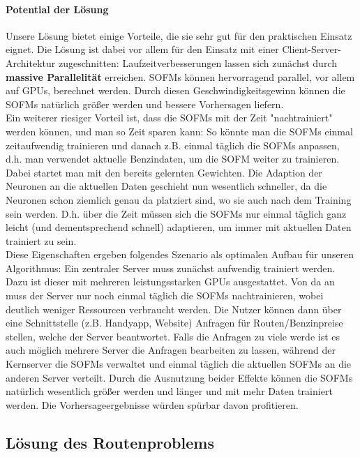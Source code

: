 \documentclass[11pt]{article}
\begin{document}
	
	\paragraph{Potential der Lösung\\}
	\label{potential}
	Unsere Lösung bietet einige Vorteile, die sie sehr gut für den praktischen Einsatz eignet. Die Lösung ist dabei vor allem für den Einsatz mit einer Client-Server-Architektur zugeschnitten:
	Laufzeitverbesserungen lassen sich zunächst durch \textbf{massive Parallelität} erreichen. SOFMs können hervorragend parallel, vor allem auf GPUs, berechnet werden. Durch diesen Geschwindigkeitsgewinn können die SOFMs natürlich größer werden und bessere Vorhersagen liefern.\\
	Ein weiterer riesiger Vorteil ist, dass die SOFMs mit der Zeit "nachtrainiert" werden können, und man so Zeit sparen kann: So könnte man die SOFMs einmal zeitaufwendig trainieren und danach z.B. einmal täglich die SOFMs anpassen, d.h. man verwendet aktuelle Benzindaten, um die SOFM weiter zu trainieren. Dabei startet man mit den bereits gelernten Gewichten. Die Adaption der Neuronen an die aktuellen Daten geschieht nun wesentlich schneller, da die Neuronen schon ziemlich genau da platziert sind, wo sie auch nach dem Training sein werden. D.h. über die Zeit müssen sich die SOFMs nur einmal täglich ganz leicht (und dementsprechend schnell) adaptieren, um immer mit aktuellen Daten trainiert zu sein.\\
	Diese Eigenschaften ergeben folgendes Szenario als optimalen Aufbau für unseren Algorithmus: Ein zentraler Server muss zunächst aufwendig trainiert werden. Dazu ist dieser mit mehreren leistungsstarken GPUs ausgestattet. Von da an muss der Server nur noch einmal täglich die SOFMs nachtrainieren, wobei deutlich weniger Ressourcen verbraucht werden. Die Nutzer können dann über eine Schnittstelle (z.B. Handyapp, Website) Anfragen für Routen/Benzinpreise stellen, welche der Server beantwortet. Falls die Anfragen zu viele werde ist es auch möglich mehrere Server die Anfragen bearbeiten zu lassen, während der Kernserver die SOFMs verwaltet und einmal täglich die aktuellen SOFMs an die anderen Server verteilt. Durch die Ausnutzung beider Effekte können die SOFMs natürlich wesentlich größer werden und länger und mit mehr Daten trainiert werden. Die Vorhersageergebnisse würden spürbar davon profitieren.
	
	
	
\subsection{Lösung des Routenproblems}
\end{document}
